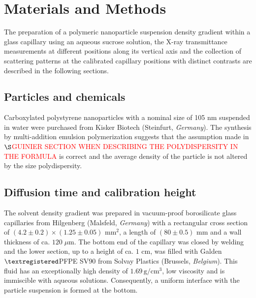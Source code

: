 \section{Materials and Methods}
The preparation of a polymeric nanoparticle suspension density gradient within a glass capillary using an aqueous sucrose solution, the X-ray transmittance measurements at different positions along its vertical axis and the collection of scattering patterns at the calibrated capillary positions with distinct contrasts are described in the following sections. 

\subsection{Particles and chemicals}
Carboxylated polystyrene nanoparticles with a nominal size of 105 nm suspended in water were purchased from Kisker Biotech (Steinfurt, \emph{Germany}). The synthesis by multi-addition emulsion polymerization suggests that the assumption made in \(\S\)\textcolor{red}{GUINIER SECTION WHEN DESCRIBING THE POLYDISPERSITY IN THE FORMULA} is correct and the average density of the particle is not altered by the size polydispersity.


\subsection{Diffusion time and calibration height}
The solvent density gradient was prepared in vacuum-proof borosilicate glass capillaries from Hilgenberg (Malsfeld, \emph{Germany}) with a rectangular cross section of \( (4.2\pm0.2)\times(1.25\pm0.05)\mbox{ mm}^2\),  a length of \((80\pm0.5) \mbox{ mm} \) and a wall thickness of ca. \(120\;\mu\mbox{m}\). The bottom end of the capillary was closed by welding and the lower section, up to a height of ca. \(1\) cm, was filled with Galden\(\textregistered\)PFPE SV90 from Solvay Plastics (Brussels, \emph{Belgium}). This fluid has an exceptionally high density of $1.69\,\mathrm{g/cm^3}$, low viscosity and is immiscible with aqueous solutions. Consequently, a uniform interface with the particle suspension is formed at the bottom. 

